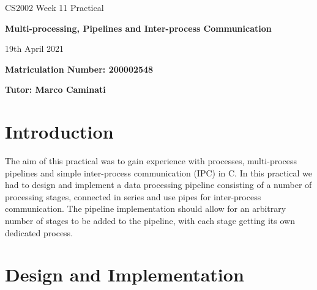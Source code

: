 \documentclass{article}
\begin{document}
    \nocite{*}

    \begin{center}
        \Huge
        CS2002 Week 11 Practical

        \vspace{0.5cm}

        \textbf{Multi-processing, Pipelines and Inter-process Communication}

        \vspace{1cm}
        \LARGE
        19th April 2021

        \large
        \vspace{1.5cm}

        \textbf{Matriculation Number: 200002548}

        \vspace{0.5cm}

        \textbf{Tutor: Marco Caminati}

    \end{center}

    \vspace*{2.9cm}

    \tableofcontents

    \newpage
    \section{Introduction}
    The aim of this practical was to gain experience with processes, multi-process pipelines and simple inter-process communication (IPC)
    in C. In this practical we had to design and implement a data processing pipeline consisting of a number of processing stages, connected in series
    and use pipes for inter-process communication.
    The pipeline implementation should allow for an arbitrary number of stages to be added to the pipeline, with each stage getting its own dedicated process.

    \section{Design and Implementation}
\end{document}
